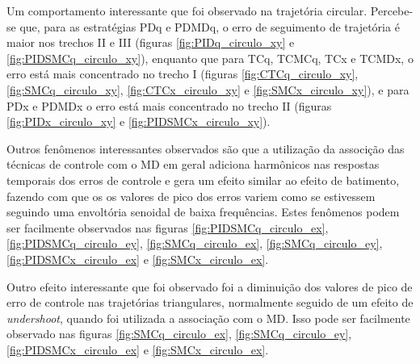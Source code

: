 \documentclass[]{politex}
\begin{document}
Um comportamento interessante que foi observado na trajetória circular. Percebe-se que, para as estratégias PDq e PDMDq, o erro de seguimento de trajetória é maior nos trechos II e III (figuras \ref{fig:PIDq_circulo_xy} e \ref{fig:PIDSMCq_circulo_xy}), enquanto que para TCq, TCMCq, TCx e TCMDx, o erro está mais concentrado no trecho I (figuras \ref{fig:CTCq_circulo_xy}, \ref{fig:SMCq_circulo_xy}, \ref{fig:CTCx_circulo_xy} e \ref{fig:SMCx_circulo_xy}), e para PDx e PDMDx o erro está mais concentrado no trecho II (figuras \ref{fig:PIDx_circulo_xy} e \ref{fig:PIDSMCx_circulo_xy}).

Outros fenômenos interessantes observados são que a utilização da associção das técnicas de controle com o MD em geral adiciona harmônicos nas respostas temporais dos erros de controle e gera um efeito similar ao efeito de batimento, fazendo com que os os valores de pico dos erros variem como se estivessem seguindo uma envoltória senoidal de baixa frequências. Estes fenômenos podem ser facilmente observados nas figuras \ref{fig:PIDSMCq_circulo_ex}, \ref{fig:PIDSMCq_circulo_ey}, \ref{fig:SMCq_circulo_ex}, \ref{fig:SMCq_circulo_ey}, \ref{fig:PIDSMCx_circulo_ex} e \ref{fig:SMCx_circulo_ex}.

Outro efeito interessante que foi observado foi a diminuição dos valores de pico de erro de controle nas trajetórias triangulares, normalmente seguido de um efeito de \emph{undershoot}, quando foi utilizada a associação com o MD. Isso pode ser facilmente observado nas figuras \ref{fig:SMCq_circulo_ex}, \ref{fig:SMCq_circulo_ey}, \ref{fig:PIDSMCx_circulo_ex} e \ref{fig:SMCx_circulo_ex}.
\end{document}
